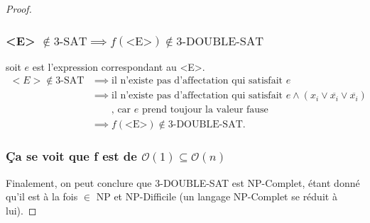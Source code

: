 \documentclass{article}
\theoremstyle{definition}
\theoremstyle{remark}
\begin{document}
\begin{proof}
	\subsubsection{<E> $\notin \text{3-SAT} \implies f\left( \text{<E>} \right) \notin \text{3-DOUBLE-SAT}$}
	soit $e$ est l'expression correspondant au <E>.
	\begin{align*}
		<E> \notin \text{3-SAT} &\implies \text{il n'existe pas d'affectation qui satisfait }e \\
	&\implies \text{il n'existe pas d'affectation qui satisfait }e \wedge \left( x_{i}\vee \overline{x_{i}} \vee \overline{x_{i}} \right) \\ 
	&\qquad\text{, car $e$ prend toujour la valeur fause} \\ 
	&\implies f\left( \text{<E>} \right) \notin \text{3-DOUBLE-SAT}
	.\end{align*}
	\subsubsection{ Ça se voit que f est de $\mathcal{O} \left ( 1 \right ) \subseteq \mathcal{O} \left ( n \right ) $}

	Finalement, on peut conclure que 3-DOUBLE-SAT est NP-Complet, étant donné qu'il est à la fois $\in $ NP et NP-Difficile (un langage NP-Complet se réduit à lui).
\end{proof}
\end{document}
